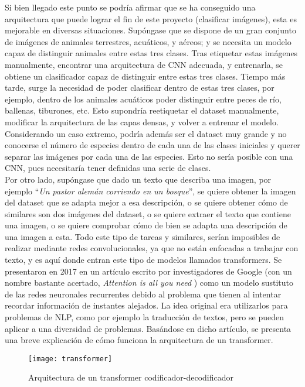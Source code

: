 			Si bien llegado este punto se podría afirmar que se ha conseguido una arquitectura que puede lograr el fin de este proyecto (clasificar imágenes), esta es mejorable en diversas situaciones. Supóngase que se dispone de un gran conjunto de imágenes de animales terrestres, acuáticos, y aéreos; y se necesita un modelo capaz de distinguir animales entre estas tres clases. Tras etiquetar estas imágenes manualmente, encontrar una arquitectura de CNN adecuada, y entrenarla, se obtiene un clasificador capaz de distinguir entre estas tres clases. Tiempo más tarde, surge la necesidad de poder clasificar dentro de estas tres clases, por ejemplo, dentro de los animales acuáticos poder distinguir entre peces de río, ballenas, tiburones, etc. Esto supondría reetiquetar el dataset manualmente, modificar la arquitectura de las capas densas, y volver a entrenar el modelo. Considerando un caso extremo, podría además ser el dataset muy grande y no conocerse el número de especies dentro de cada una de las clases iniciales y querer separar las imágenes por cada una de las especies. Esto no sería posible con una CNN, pues necesitaría tener definidas una serie de clases. \\
			
			Por otro lado, supóngase que dado un texto que describa una imagen, por ejemplo ``\textit{Un pastor alemán corriendo en un bosque}'', se quiere obtener la imagen del dataset que se adapta mejor a esa descripción, o se quiere obtener cómo de similares son dos imágenes del dataset, o se quiere extraer el texto que contiene una imagen, o se quiere comprobar cómo de bien se adapta una descripción de una imagen a esta. Todo este tipo de tareas y similares, serían imposibles de realizar mediante redes convolucionales, ya que no están enfocadas a trabajar con texto, y es aquí donde entran este tipo de modelos llamados transformers. Se presentaron en 2017 en un artículo escrito por investigadores de Google (con un nombre bastante acertado, \textit{Attention is all you need} \cite{attention}) como un modelo sustituto de las redes neuronales recurrentes debido al problema que tienen al intentar recordar información de instantes alejados. La idea original era utilizarlos para problemas de NLP, como por ejemplo la traducción de textos, pero se pueden aplicar a una diversidad de problemas. Basándose en dicho artículo, se presenta una breve explicación de cómo funciona la arquitectura de un transformer. \\
			
			\begin{figure}
				\centering
				\texttt{[image: transformer]}
				\caption{Arquitectura de un transformer codificador-decodificador}
				\label{fig:arq_transf}
			\end{figure}
			
